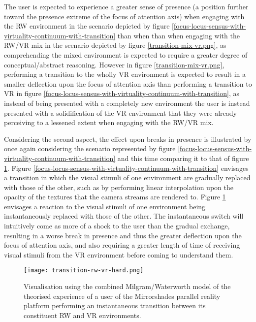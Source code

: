 The user is expected to experience a greater sense of presence (a position further toward the presence extreme of the focus of attention axis) when engaging with the RW environment in the scenario depicted by figure \ref{focus-locus-sensus-with-virtuality-continuum-with-transition} than when than when engaging with the RW/VR mix in the scenario depicted by figure \ref{transition-mix-vr.png}, as comprehending the mixed environment is expected to require a greater degree of conceptual/abstract reasoning. However in figure \ref{transition-mix-vr.png}, performing a transition to the wholly VR environment is expected to result in a smaller deflection upon the focus of attention axis than performing a transition to VR in figure \ref{focus-locus-sensus-with-virtuality-continuum-with-transition}, as instead of being presented with a completely new environment the user is instead presented with a solidification of the VR environment that they were already perceiving to a lessened extent when engaging with the RW/VR mix.

\newpage

Considering the second aspect, the effect upon breaks in presence is illustrated by once again considering the scenario represented by figure \ref{focus-locus-sensus-with-virtuality-continuum-with-transition} and this time comparing it to that of figure \ref{transition-rw-vr-hard.png}. Figure \ref{focus-locus-sensus-with-virtuality-continuum-with-transition} envisages a transition in which the visual stimuli of one environment are gradually replaced with those of the other, such as by performing linear interpolation upon the opacity of the textures that the camera streams are rendered to. Figure \ref{transition-rw-vr-hard.png} envisages a reaction to the visual stimuli of one environment being instantaneously replaced with those of the other. The instantaneous switch will intuitively come as more of a shock to the user than the gradual exchange, resulting in a worse break in presence and thus the greater deflection upon the focus of attention axis, and also requiring a greater length of time of receiving visual stimuli from the VR environment before coming to understand them.

\begin{figure}[h]
	\begin{center}
		\texttt{[image: transition-rw-vr-hard.png]}
		\caption{Visualisation using the combined Milgram/Waterworth model of the theorised experience of a user of the Mirrorshades parallel reality platform performing an instantaneous transition between its constituent RW and VR environments.}
		\label{transition-rw-vr-hard.png}
	\end{center}
\end{figure}

